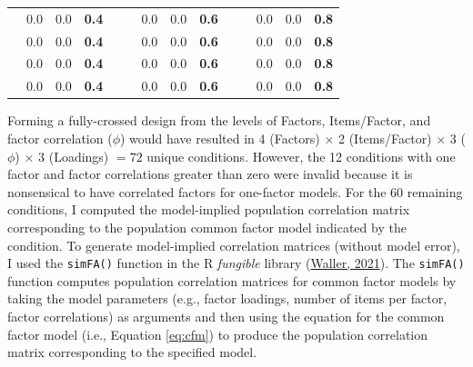 \documentclass[11pt]{umnthesis}
\begin{document}
\begin{table}
\begin{tabular}{llllllllllllll}
                        & 0.0                    & 0.0                    & \textbf{0.4}           &                      &                         & 0.0                    & 0.0                    & \textbf{0.6}           &                      &                         & 0.0                    & 0.0                    & \textbf{0.8}            \\
                        & 0.0                    & 0.0                    & \textbf{0.4}           &                      &                         & 0.0                    & 0.0                    & \textbf{0.6}           &                      &                         & 0.0                    & 0.0                    & \textbf{0.8}            \\
                        & 0.0                    & 0.0                    & \textbf{0.4}           &                      &                         & 0.0                    & 0.0                    & \textbf{0.6}           &                      &                         & 0.0                    & 0.0                    & \textbf{0.8}            \\
                        & 0.0                    & 0.0                    & \textbf{0.4}           &                      &                         & 0.0                    & 0.0                    & \textbf{0.6}           &                      &                         & 0.0                    & 0.0                    & \textbf{0.8}            \\
\cline{2-4}\cline{7-9}\cline{12-14}
\end{tabular}
\end{table}

Forming a fully-crossed design from the levels of Factors, Items/Factor, and factor correlation (\(\phi\)) would have resulted in 4 (Factors) \(\times\) 2 (Items/Factor) \(\times\) 3 (\(\phi\)) \(\times\) 3 (Loadings) \(= 72\) unique conditions. However, the 12 conditions with one factor and factor correlations greater than zero were invalid because it is nonsensical to have correlated factors for one-factor models. For the 60 remaining conditions, I computed the model-implied population correlation matrix corresponding to the population common factor model indicated by the condition. To generate model-implied correlation matrices (without model error), I used the \texttt{simFA()} function in the R \emph{fungible} library (\protect\hyperlink{ref-waller2021}{Waller, 2021}). The \texttt{simFA()} function computes population correlation matrices for common factor models by taking the model parameters (e.g., factor loadings, number of items per factor, factor correlations) as arguments and then using the equation for the common factor model (i.e., Equation \eqref{eq:cfm}) to produce the population correlation matrix corresponding to the specified model.
\end{document}
